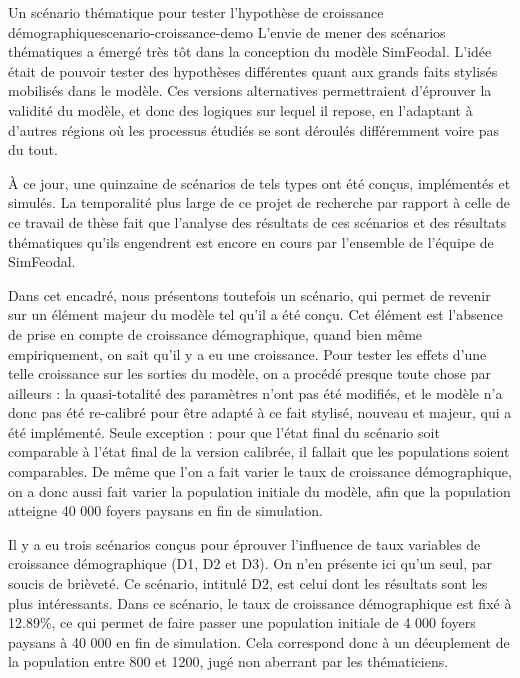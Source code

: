 \begin{encadre}{Un scénario thématique pour tester l'hypothèse de croissance démographique}{scenario-croissance-demo}
	\renewcommand{\thempfootnote}{\alph{mpfootnote}}	
L'envie de mener des \og scénarios thématiques\fg{} a émergé très tôt dans la conception du modèle SimFeodal.
L'idée était de pouvoir tester des hypothèses différentes quant aux grands faits stylisés mobilisés dans le modèle.
Ces versions alternatives permettraient d'éprouver la validité du modèle, et donc des logiques sur lequel il repose, en l'adaptant à d'autres régions où les processus étudiés se sont déroulés différemment voire pas du tout.

\vspace*{1em} À ce jour, une quinzaine de scénarios de tels types ont été conçus, implémentés et simulés.
La temporalité plus large de ce projet de recherche par rapport à celle de ce travail de thèse fait que l'analyse des résultats de ces scénarios et des résultats thématiques qu'ils engendrent est encore en cours par l'ensemble de l'équipe de SimFeodal.

Dans cet encadré, nous présentons toutefois un scénario, qui permet de revenir sur un élément majeur du modèle tel qu'il a été conçu.
Cet élément est l'absence de prise en compte de croissance démographique, quand bien même empiriquement, on sait qu'il y a eu une croissance.
Pour tester les effets d'une telle croissance sur les sorties du modèle, on a procédé presque toute chose par ailleurs : la quasi-totalité des paramètres n'ont pas été modifiés, et le modèle n'a donc pas été re-calibré pour être adapté à ce fait stylisé, nouveau et majeur, qui a été implémenté.
Seule exception : pour que l'état final du scénario soit comparable à l'état final de la version calibrée, il fallait que les populations soient comparables.
De même que l'on a fait varier le taux de croissance démographique, on a donc aussi fait varier la population initiale du modèle, afin que la population atteigne 40 000 foyers paysans en fin de simulation.

\vspace*{1em} Il y a eu trois scénarios conçus pour éprouver l'influence de taux variables de croissance démographique (D1, D2 et D3).
On n'en présente ici qu'un seul, par soucis de brièveté.
Ce scénario, intitulé \og D2\fg{}, est celui dont les résultats sont les plus intéressants.
Dans ce scénario, le taux de croissance démographique est fixé à 12.89\%, ce qui permet de faire passer une population initiale de 4 000 foyers paysans à 40 000 en fin de simulation.
Cela correspond donc à un décuplement de la population entre 800 et 1200, jugé non aberrant par les thématiciens.


\end{encadre}
